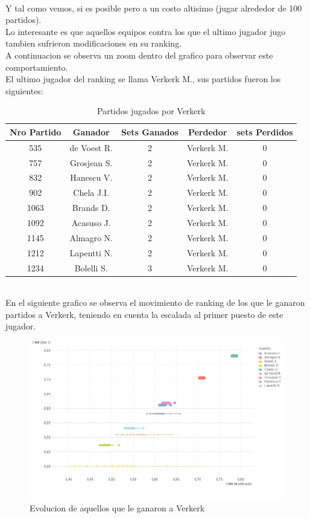 \\
Y tal como vemos, si es posible pero a un costo altisimo (jugar alrededor de 100 partidos).
\\
Lo interesante es que aquellos equipos contra los que el ultimo jugador jugo tambien sufrieron modificaciones en su ranking. \\
A continuacion se observa un zoom dentro del grafico para observar este comportamiento.
\\

El ultimo jugador del ranking se llama Verkerk M., sus partidos fueron los siguientes:
\\
\begin{table}[H]
\caption{Partidos jugados por Verkerk}
\centering
\begin{tabular}{| c | c | c | c | c |}
\hline \hline
    Nro Partido & Ganador & Sets Ganados & Perdedor & sets Perdidos \\ 
    \hline
    535 & de Voest R. & 2 & Verkerk M. & 0 \\ 
    757 & Grosjean S. & 2 & Verkerk M. & 0 \\ 
    832 & Hanescu V. & 2 & Verkerk M. & 0 \\ 
    902 & Chela J.I. & 2 & Verkerk M. & 0 \\ 
    1063 & Brands D. & 2 & Verkerk M. & 0 \\ 
    1092 & Acasuso J. & 2 & Verkerk M. & 0 \\ 
    1145 & Almagro N. & 2 & Verkerk M. & 0 \\ 
    1212 & Lapentti N. & 2 & Verkerk M. & 0 \\ 
    1234 & Bolelli S. & 3 & Verkerk M. & 0 \\ 
    \hline
    \end{tabular}
\end{table}

\\
En el siguiente grafico se observa el movimiento de ranking de los que le ganaron partidos a Verkerk, teniendo en cuenta la escalada al primer puesto de este jugador.
\\
\begin{figure}[H]
\centering
\includegraphics[width=1\textwidth]{IMG/partidos jugados vs verkerk grafico.png}
\caption{Evolucion de aquellos que le ganaron a Verkerk}
\label{fig:Evolucion de aquellos que le ganaron a Verkerk}
\end{figure}

